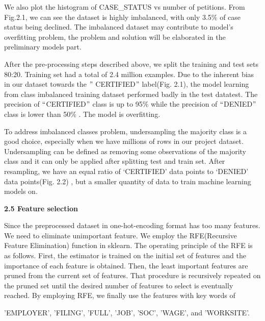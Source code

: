 \documentclass[12pt]{article}
\begin{document}
\begin{justify}
We also plot the histogram of CASE\_STATUS vs number of petitions. From Fig.2.1, we can see the dataset is highly imbalanced, with only 3.5$\%$  of case status being declined. The imbalanced dataset may contribute to model’s overfitting problem, the problem and solution will be elaborated in the preliminary models part.
\end{justify}\par

\begin{justify}
After the pre-processing steps described above, we split the training and test sets 80:20. Training set had a total of 2.4 million examples. Due to the inherent bias in our dataset towards the $"$ CERTIFIED$"$  label(Fig. 2.1), the model learning from class imbalanced training dataset performed badly in the test datatest. The precision of $``$CERTIFIED$"$  class is up to 95$\%$  while the precision of $``$DENIED$"$  class is lower than 50$\%$ . The model is overfitting.
\end{justify}\par

\begin{justify}
To address imbalanced classes problem, undersampling the majority class is a good choice, especially when we have millions of rows in our project dataset. Undersampling can be defined as removing some observations of the majority class and it can only be applied after splitting test and train set. After resampling, we have an equal ratio of ‘CERTIFIED’ data points to ‘DENIED’ data points(Fig. 2.2) , but a smaller quantity of data to train machine learning models on.
\end{justify}\par


\vspace{\baselineskip}
\begin{justify}
\textbf{2.5 Feature selection}
\end{justify}\par

\begin{justify}
Since the preprocessed dataset in one-hot-encoding format has too many features. We need to eliminate unimportant feature. We employ the RFE(Recursive Feature Elimination) function in sklearn. The operating principle of the RFE is as follows. First, the estimator is trained on the initial set of features and the importance of each feature is obtained. Then, the least important features are pruned from the current set of features. That procedure is recursively repeated on the pruned set until the desired number of features to select is eventually reached. By employing RFE, we finally use the features with key words of {\fontsize{10pt}{12.0pt}\selectfont 'EMPLOYER', 'FILING', 'FULL', 'JOB', 'SOC', 'WAGE', and 'WORKSITE'.\par}
\end{justify}\par
\end{document}
